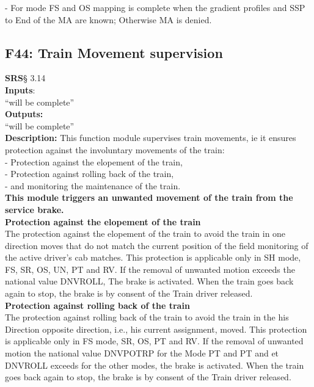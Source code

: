 \documentclass{template/openetcs_report}
\begin{document}
- For mode FS and OS mapping is complete when the gradient profiles and SSP to 
End of the MA are known; Otherwise MA is denied.\\

\subsection {F44: Train Movement supervision}
 \textbf{SRS}§ 3.14 \\
 
 \textbf{Inputs}:\\
``will be complete''\\
 
 \textbf{Outputs:}\\
 ``will be complete''\\
 
 \textbf{Description:} 
This function module supervises train movements, ie it ensures protection against 
the involuntary movements of the train: \\

- Protection against the elopement of the train, \\

- Protection against rolling back of the train, \\

- and monitoring the maintenance of the train. \\

\textbf{This module triggers an unwanted movement of the train from the service brake.} \\

\textbf{Protection against the elopement of the train}\\
The protection against the elopement of the train to avoid the train in one direction 
moves that do not match the current position of the field monitoring of the active driver's cab 
matches. 
This protection is applicable only in SH mode, FS, SR, OS, UN, PT and RV.
If the removal of unwanted motion exceeds the national value DNVROLL, 
The brake is activated. 
When the train goes back again to stop, the brake is by consent of the 
Train driver released. \\

\textbf{Protection against rolling back of the train }\\
The protection against rolling back of the train to avoid the train in the his 
Direction opposite direction, i.e., his current assignment, moved. 
This protection is applicable only in FS mode, SR, OS, PT and RV. 
If the removal of unwanted motion the national value DNVPOTRP for the 
Mode PT and PT and et DNVROLL exceeds for the other modes, the brake is 
activated. When the train goes back again to stop, the brake is by consent of the Train driver released. \\
\end{document}
